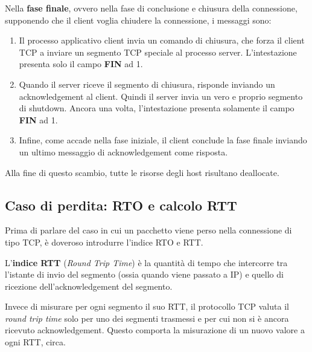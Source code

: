 \documentclass[a4paper]{article}
\begin{document}
	\newpage
	
	\noindent
	Nella \textcolor{Red3}{\textbf{fase finale}}, ovvero nella fase di conclusione e chiusura della connessione, supponendo che il client voglia chiudere la connessione, i messaggi sono:
	\begin{enumerate}
		\item Il processo applicativo client invia un comando di chiusura, che forza il client TCP a inviare un segmento TCP speciale al processo server.\newline
		L’intestazione presenta solo il campo \textbf{FIN} ad 1.
		
		\item Quando il server riceve il segmento di chiusura, risponde inviando un acknowledgement al client. Quindi il server invia un vero e proprio segmento di shutdown.\newline
		Ancora una volta, l'intestazione presenta solamente il campo \textbf{FIN} ad 1.
		
		\item Infine, come accade nella fase iniziale, il client conclude la fase finale inviando un ultimo messaggio di acknowledgement come risposta.
	\end{enumerate}
	Alla fine di questo scambio, tutte le risorse degli host risultano deallocate.
	
	\newpage
	
	\subsection{Caso di perdita: RTO e calcolo RTT}
	
	Prima di parlare del caso in cui un pacchetto viene perso nella connessione di tipo TCP, è doveroso introdurre l’indice RTO e RTT.\newline
	
	\noindent
	L’\textcolor{Red3}{\textbf{indice RTT}} (\emph{Round Trip Time}) è la quantità di tempo che intercorre tra l’istante di invio del segmento (ossia quando viene passato a IP) e quello di ricezione dell’acknowledgement del segmento.\newline
	
	\noindent
	Invece di misurare per ogni segmento il suo RTT, il protocollo TCP valuta il \emph{round trip time} solo per uno dei segmenti trasmessi e per cui non si è ancora ricevuto acknowledgement. Questo comporta la misurazione di un nuovo valore a ogni RTT, circa.\newline
	
\end{document}
